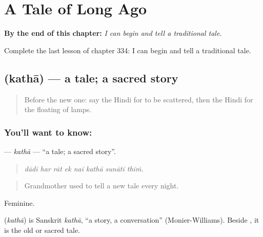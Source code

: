 
\chapter{A Tale of Long Ago}
\label{ch:hi-a-tale-of-long-ago}

\begin{chapteropening}
\textbf{By the end of this chapter:} \emph{I can begin and tell a traditional tale.}

Complete the last lesson of chapter 334: I can begin and tell a traditional tale.
\end{chapteropening}

\section[\texorpdfstring{\hi{कथा} (kathā)}{कथा (kathā)}]{ (kathā) — a tale; a sacred story}

\label{lesson:HI-C334-katha}



\begin{quote}
Before the new one: say the Hindi for to be scattered, then the Hindi for the floating of lamps.
\end{quote}

\subsection*{You'll want to know: }
\textbf{} — \emph{kathā} — \textquotedblleft{}a tale; a sacred story\textquotedblright{}.

\begin{quote}
       
\end{quote}

\begin{quote}
\emph{dādī har rāt ek naī kathā sunātī thīṁ.}
\end{quote}

\begin{quote}
Grandmother used to tell a new tale every night.
\end{quote}

Feminine.

\begin{cousinweb}
\textbf{} (\emph{kathā}) is Sanskrit \emph{kathā}, \textquotedblleft{}a story, a conversation\textquotedblright{} (Monier-Williams). Beside \textbf{}, it is the old or sacred tale.
\end{cousinweb}

